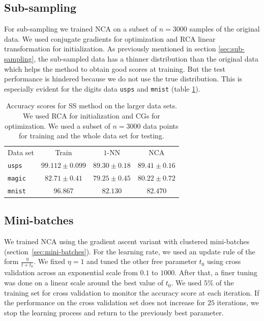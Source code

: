  \subsection{Sub-sampling}
  \label{subsec:eval-sub-sampling}

    For sub-sampling we trained NCA on a subset of $n=3000$ samples of the original data. We used conjugate gradients for optimization and RCA linear transformation for initialization. As previously mentioned in section \ref{sec:sub-sampling}, the sub-sampled data has a thinner distribution than the original data which helps the method to obtain good scores at training. But the test performance is hindered because we do not use the true distribution. This is especially evident for the digits data \texttt{usps} and \texttt{mnist} (table \ref{tab:ss}). 
    \begin{table}
    	\centering
    	\begin{tabular}{lccc}
    	\toprule
    	Data set & Train & $1$-NN & NCA \\
    	\cmidrule(r){2-2}\cmidrule(r){3-4}
    	 \texttt{usps}&$99.112 \pm 0.099$&$89.30 \pm 0.18$&$89.41 \pm 0.16$\\
    	 \texttt{magic}&$82.71 \pm 0.41$&$79.25 \pm 0.45$&$80.22 \pm 0.72$\\
    	 \texttt{mnist}&$96.867$&$82.130$&$82.470$\\
    	 \bottomrule
    	\end{tabular}
	\label{tab:ss}
	\caption{Accuracy scores for SS method on the larger data sets. We used RCA for initialization and CGs for optimization. We used a subset of $n=3000$ data points for training and the whole data set for testing.}
    \end{table}

    \subsection{Mini-batches}
    \label{subsec:eval-mini-batches}

    We trained NCA using the gradient ascent variant with clustered mini-batches (section~\ref{sec:mini-batches}). For the learning rate, we used an update rule of the form $\frac{\eta}{t+t_0}$. We fixed $\eta=1$ and tuned the other free parameter $t_0$ using cross validation across an exponential scale from $0.1$ to $1000$. After that, a finer tuning was done on a linear scale around the best value of $t_0$. We used $5\%$ of the training set for cross validation to monitor the accuracy score at each iteration. If the performance on the cross validation set does not increase for $25$ iterations, we stop the learning process and return to the previously best parameter.

